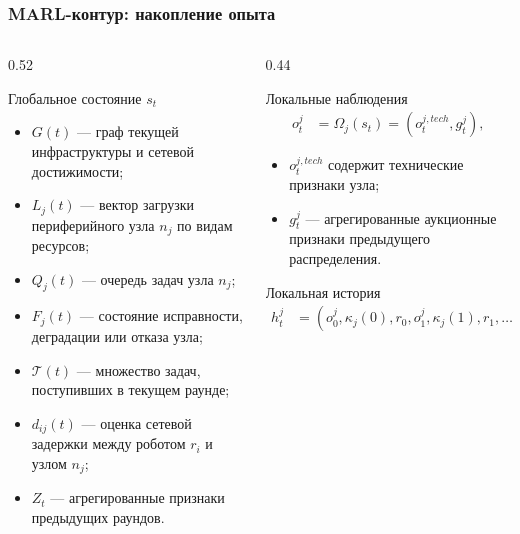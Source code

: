 \begin{frame}
	\frametitle{MARL-контур: накопление опыта}
	\small
	\begin{columns}[T,onlytextwidth]
		\begin{column}{0.52\textwidth}
			\begin{block}{Глобальное состояние $s_t$}
				\begin{itemize}
					\item $G(t)$ --- граф текущей инфраструктуры и сетевой достижимости;
					\item $L_j(t)$ --- вектор загрузки периферийного узла $n_j$ по видам ресурсов;
					\item $Q_j(t)$ --- очередь задач узла $n_j$;
					\item $F_j(t)$ --- состояние исправности, деградации или отказа узла;
					\item $\mathcal{T}(t)$ --- множество задач, поступивших в текущем раунде;
					\item $d_{ij}(t)$ --- оценка сетевой задержки между роботом $r_i$ и узлом $n_j$;
					\item $Z_t$ --- агрегированные признаки предыдущих раундов.
				\end{itemize}
			\end{block}
		\end{column}
		\begin{column}{0.44\textwidth}
			\begin{block}{Локальные наблюдения}
				\begin{align*}
					o^j_t &= \Omega_j(s_t) = \left(o^{j,tech}_t,g^j_t\right),
				\end{align*}
				\begin{itemize}
					\item $o^{j,tech}_t$ содержит технические признаки узла;
					\item $g^j_t$ --- агрегированные аукционные признаки предыдущего распределения.
				\end{itemize}
			\end{block}
			\begin{block}{Локальная история}
				\begin{align*}
					h^j_t &= \left(o^j_0,\kappa_j(0),r_0, o^j_1,\kappa_j(1),r_1,\ldots,o^j_t\right)
				\end{align*}
			\end{block}
		\end{column}
	\end{columns}
\end{frame}

